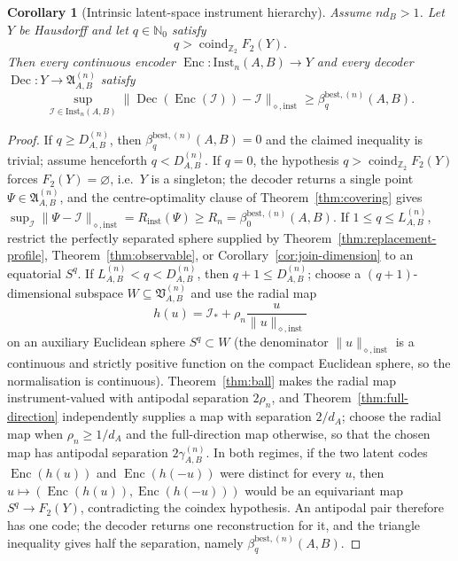 \documentclass[11pt,a4paper]{article}
\newtheorem{corollary}[theorem]{Corollary}
\newcommand{\Inst}{\mathrm{Inst}}
\newcommand{\coind}{\operatorname{coind}_{\mathbb Z_2}}
\begin{document}
\begin{corollary}[Intrinsic latent-space instrument hierarchy]
\label{cor:intrinsic}
Assume $nd_B>1$. Let $Y$ be Hausdorff and let $q\in\mathbb N_0$ satisfy
\[
q>\coind F_2(Y).
\]
Then every continuous encoder $\operatorname{Enc}:\Inst_n(A,B)\to Y$ and every decoder $\operatorname{Dec}:Y\to\mathfrak A_{A,B}^{(n)}$ satisfy
\[
\sup_{\mathcal I\in\Inst_n(A,B)}
\|\operatorname{Dec}(\operatorname{Enc}(\mathcal I))-\mathcal I\|_{\diamond,\mathrm{inst}}
\ge\beta_q^{\mathrm{best},(n)}(A,B).
\]
\end{corollary}

\begin{proof}
If $q\ge D_{A,B}^{(n)}$, then $\beta_q^{\mathrm{best},(n)}(A,B)=0$ and the claimed inequality is trivial; assume henceforth $q<D_{A,B}^{(n)}$. If $q=0$, the hypothesis $q>\coind F_2(Y)$ forces $F_2(Y)=\varnothing$, i.e.\ $Y$ is a singleton; the decoder returns a single point $\Psi\in\mathfrak A_{A,B}^{(n)}$, and the centre-optimality clause of Theorem~\ref{thm:covering} gives $\sup_{\mathcal I}\|\Psi-\mathcal I\|_{\diamond,\mathrm{inst}}=R_{\mathrm{inst}}(\Psi)\ge R_n=\beta_0^{\mathrm{best},(n)}(A,B)$. If $1\le q\le L_{A,B}^{(n)}$, restrict the perfectly separated sphere supplied by Theorem~\ref{thm:replacement-profile}, Theorem~\ref{thm:observable}, or Corollary~\ref{cor:join-dimension} to an equatorial $S^q$. If $L_{A,B}^{(n)}<q<D_{A,B}^{(n)}$, then $q+1\le D_{A,B}^{(n)}$; choose a $(q+1)$-dimensional subspace $W\subseteq\mathfrak V_{A,B}^{(n)}$ and use the radial map
\[
h(u)=\mathcal I_*+\rho_n\frac{u}{\|u\|_{\diamond,\mathrm{inst}}}
\]
on an auxiliary Euclidean sphere $S^q\subset W$ (the denominator $\|u\|_{\diamond,\mathrm{inst}}$ is a continuous and strictly positive function on the compact Euclidean sphere, so the normalisation is continuous). Theorem~\ref{thm:ball} makes the radial map instrument-valued with antipodal separation $2\rho_n$, and Theorem~\ref{thm:full-direction} independently supplies a map with separation $2/d_A$; choose the radial map when $\rho_n\ge1/d_A$ and the full-direction map otherwise, so that the chosen map has antipodal separation $2\gamma_{A,B}^{(n)}$. In both regimes, if the two latent codes $\operatorname{Enc}(h(u))$ and $\operatorname{Enc}(h(-u))$ were distinct for every $u$, then $u\mapsto(\operatorname{Enc}(h(u)),\operatorname{Enc}(h(-u)))$ would be an equivariant map $S^q\to F_2(Y)$, contradicting the coindex hypothesis. An antipodal pair therefore has one code; the decoder returns one reconstruction for it, and the triangle inequality gives half the separation, namely $\beta_q^{\mathrm{best},(n)}(A,B)$.
\end{proof}
\end{document}

